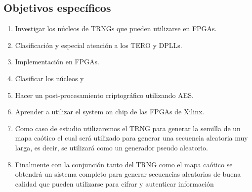 		\subsection{Objetivos específicos}
			\begin{enumerate}
				\item Investigar los núcleos de TRNGs que pueden utilizarse en FPGAs.
				\item Clasificación y especial atención a los TERO y DPLLs.
				\item Implementación en FPGAs.
				\item Clasificar los núcleos y
				\item Hacer un post-procesamiento criptográfico utilizando AES.
				\item Aprender a utilizar el system on chip de las FPGAs de Xilinx.
				\item Como caso de estudio utilizaremos el TRNG para generar la semilla de un mapa caótico el cual será utilizado para generar una secuencia aleatoria muy larga, es decir, se utilizará como un generador pseudo aleatorio.
				\item Finalmente con la conjunción tanto del TRNG como el mapa caótico se obtendrá un sistema completo para generar secuencias aleatorias de buena calidad que pueden utilizarse para cifrar y autenticar información
			\end{enumerate}


